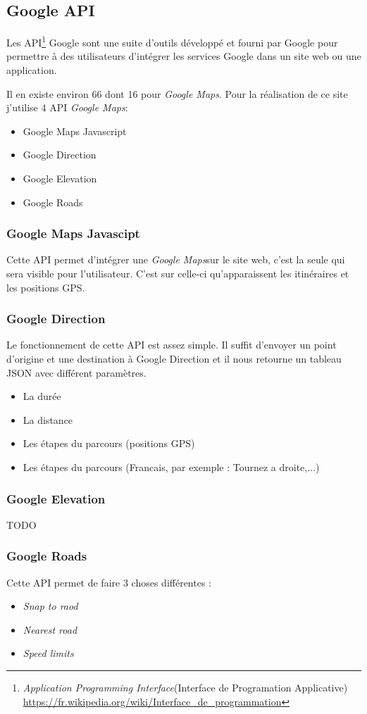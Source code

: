 \documentclass[a4paper]{article}
\newcommand{\gmap}{\emph{Google Maps}}
\begin{document}
\subsection{Google API}
Les API\footnote{\emph{Application Programming Interface}(Interface de Programation Applicative) \url{https://fr.wikipedia.org/wiki/Interface_de_programmation}} Google sont une suite d'outils développé et fourni par Google pour permettre à des utilisateurs d'intégrer les services Google dans un site web ou une application.

Il en existe environ 66 dont 16 pour \gmap. Pour la réalisation de ce site j'utilise 4 API \gmap : 
\begin{itemize}
    \item Google Maps Javascript
    \item Google Direction
    \item Google Elevation
    \item Google Roads
\end{itemize}

\subsubsection{Google Maps Javascipt}
Cette API permet d'intégrer une \gmap sur le site web, c'est la seule qui sera visible pour l'utilisateur. C'est sur celle-ci qu'apparaissent les itinéraires et les positions GPS.
\subsubsection{Google Direction}
Le fonctionnement de cette API est assez simple. Il suffit d'envoyer un point d'origine et une destination à Google Direction et il nous retourne un tableau JSON avec différent paramètres.
\begin{itemize}
    \item La durée
    \item La distance
    \item Les étapes du parcours (positions GPS)
    \item Les étapes du parcours (Francais, par exemple : Tournez a droite,...)
\end{itemize}

\subsubsection{Google Elevation}
TODO
\subsubsection{Google Roads}
Cette API permet de faire 3 choses différentes :
\begin{itemize}
    \item \emph{Snap to raod}
    \item \emph{Nearest road}
    \item \emph{Speed limits}
\end{itemize}
\end{document}
